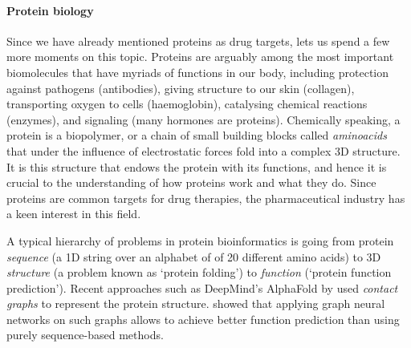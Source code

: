 \paragraph{Protein biology} 
Since we have already mentioned proteins as drug targets, lets us spend a few more moments on this topic. 
%
Proteins are arguably among the most important biomolecules 
that have myriads of functions in our body, including protection against pathogens (antibodies), giving structure to our skin (collagen), transporting oxygen to cells (haemoglobin), catalysing chemical reactions (enzymes), and signaling (many hormones are proteins). 
%
Chemically speaking, a protein is a biopolymer, or a chain of small building blocks called {\em aminoacids} that under the influence of electrostatic forces fold into a complex 3D structure. It is this structure that endows the protein with its functions, and hence it is crucial to the understanding of how proteins work and what they do. Since proteins are common targets for drug therapies, %
the pharmaceutical industry has a keen interest in this field.


A typical hierarchy of problems in protein bioinformatics is going from protein {\em sequence} (a 1D string over an alphabet of of 20 different amino acids) to 3D {\em structure} (a problem known as `protein folding') to {\em function} (`protein function prediction'). 
%
Recent approaches such as DeepMind's AlphaFold by  \cite{senior2020improved} used {\em contact graphs} to represent the protein structure. \cite{gligorijevic2020structure} showed that applying graph neural networks on such graphs allows to achieve better function prediction than using purely sequence-based methods. 


